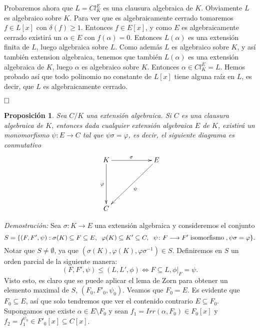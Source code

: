 \documentclass[12pt]{article}
\newtheorem{proposition}[theorem]{Proposición}
\begin{document}
Probaremos ahora que $L = Cl_{K}^{E}$ es una clausura algebraica de $K$. Obviamente $L$ es algebraico sobre $K$. Para ver que es algebraicamente cerrado tomaremos $f \in L[x]$ con $\delta (f) \geq 1$. Entonces $f \in E[x]$, y como $E$ es algebraicamente cerrado existirá un $\alpha \in E$ con $f(\alpha)=0$. Entonces $L(\alpha)$ es una extensión finita de $L$, luego algebraica sobre $L$. Como además $L$ es algebraico sobre $K$, y así también extension algebraica, tenemos que también $L(\alpha)$ es una extensión algebraica de $K$, luego $\alpha$ es algebraico sobre $K$. Entonces $\alpha \in Cl_{K}^{E} = L$. Hemos probado así que todo polinomio no constante de $L[x]$ tiene alguna raíz en $L$, es decir, que $L$ es algebraicamente cerrado.

$\hfill \square$

\begin{proposition} Sea $C/K$ una extensión algebraica. Si $C$ es una clausura algebraica de $K$, entonces dada cualquier extensión algebraica $E$ de $K$, existirá un monomorfismo $\psi \colon E \longrightarrow C$ tal que $\psi \sigma = \varphi$, es decir, el siguiente diagrama es conmutativo 
$$\xymatrix @=2cm {K \ar[r]^{\sigma} \ar[d]_{\varphi} & E\ar[ld]^\psi  \\ C   }$$
\end{proposition}
\emph{Demostración: }
Sea $\sigma \colon K \longrightarrow E$ una extensión algebraica y consideremos el conjunto $$S = \lbrace (F, F', \psi): \sigma (K) \subseteq F \subseteq E,\hspace{0.2cm} \varphi(K) \subseteq K' \subseteq C, \hspace{0.2cm} \psi \colon F \longrightarrow F' \hspace{0.1cm} \text{isomorfismo} \hspace{0.1cm}, \psi \sigma = \varphi \rbrace .$$
Notar que $S \neq \emptyset$, ya que $(\sigma(K), \varphi(K), \varphi \sigma^{-1}) \in S$. Definiremos en $S$ un orden parcial de la siguiente manera: $$(F, F', \psi) \leq (L,L', \phi) \Longleftrightarrow F \subseteq L, \left.\phi \right|_F = \psi.$$ 
Visto esto, es claro que se puede aplicar el lema de Zorn para obtener un elemento maximal de $S$, $(F_{0},F'_{0}, \psi_{0})$. Veamos que $F_{0} = E$. Es evidente que $F_{0} \subseteq E$, así que solo tendremos que ver el contenido contrario $E \subseteq F_{0}$. Supongamos que existe $\alpha \in E \setminus F_{0}$ y sean $f_{1} = Irr(\alpha, F_{0}) \in F_{0}[x]$ y $f_{2} = f_{1}^{\psi_{0}} \in F'_{0}[x] \subseteq C[x]$.
\end{document}
